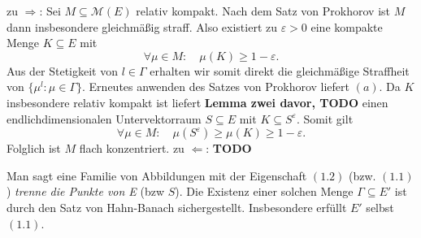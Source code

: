 \begin{proof*}
    zu $\Rightarrow$: 
    Sei $M \subseteq \mathcal{M}(E)$ relativ kompakt. Nach dem Satz von Prokhorov ist $M$ dann insbesondere gleichmäßig straff. 
    Also existiert zu $\varepsilon > 0$ eine kompakte Menge $K \subseteq E$ mit 
    $$
        \forall \mu \in M: \quad \mu(K) \geq 1 - \varepsilon.   
    $$ 
    Aus der Stetigkeit von $l \in \Gamma$ erhalten wir somit direkt die gleichmäßige Straffheit von $\{\mu^l : \mu \in \Gamma\}$. Erneutes anwenden des Satzes von Prokhorov liefert $(a)$. 
    Da $K$ insbesondere relativ kompakt ist liefert \textbf{Lemma zwei davor, TODO} einen endlichdimensionalen Untervektorraum $S \subseteq E$ mit $K \subseteq S^{\varepsilon}$. Somit gilt
    $$
        \forall \mu \in M: \quad \mu(S^{\varepsilon}) \geq \mu(K) \geq 1 - \varepsilon.
    $$
    Folglich ist $M$ flach konzentriert. 
    \newline 
    zu $\Leftarrow$: 
    \textbf{TODO}
\end{proof*}

\begin{remark}%
    Man sagt eine Familie von Abbildungen mit der Eigenschaft $(1.2)$ (bzw. $(1.1)$ ) \textit{trenne die Punkte von E} (bzw $S$). Die Existenz einer solchen Menge $\Gamma \subseteq E'$ ist durch den Satz von Hahn-Banach sichergestellt. 
    Insbesondere erfüllt $E'$ selbst$(1.1)$. 
\end{remark}